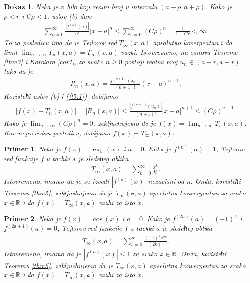 \documentclass[12pt,a4paper]{article}
\newtheorem{pri}{Primer}[section]
\newtheorem*{dokaz}{Dokaz}
\begin{document}
\begin{dokaz}
Neka je $x$ bilo koji realni broj u intervalu 
$(a-\rho,a+\rho)$. 
Kako je $\rho<r$ i $C\rho<1$, uslov (b) daje 
\begin{align*}
    \sum_{n=0}^{\infty}
    \frac{|f^{(n)}(a)|}{n!}|x-a|^{n}
    \leq 
    \sum_{n=0}^{\infty}
    (C\rho)^{n}
    =
    \frac{1}{1-Cr}<\infty. 
\end{align*}
To za posledicu ima da je 
Tejlorov red $T_{\infty}(x,a)$ apsolutno 
kovergentan i da limit 
$\lim_{n\rightarrow\infty}T_{n}(x,a)=T_{\infty}(x,a)$
vazhi. 
Istovremeno, na osnovu Teoreme \ref{thm3} i Korolara \ref{cor1}, 
za svako $n\geq 0$ postoji realna broj 
$u_{n}\in(a-r,a+r)$ tako da je 
\begin{align}\label{t5.1}
    R_{n}(x,a)
    =
    \frac{f^{(n+1)}(u_{n})}{(n+1)!}(x-a)^{n+1}. 
\end{align}
Koristeћi uslov (b) i (\ref{t5.1}), dobijamo 
\begin{align*}
    |f(x)-T_{n}(x,a)|
    =
    |R_{n}(x,a)|
    \leq 
    \frac{|f^{(n+1)}(u_{n})|}{(n+1)!}|x-a|^{n+1}
    \leq 
    (C\rho)^{n+1}. 
\end{align*}
Kako je $\lim_{n\rightarrow\infty}(C\rho)^{n}=0$, 
zakljuchujemo da je $f(x)=\lim_{n\rightarrow\infty}T_{n}(x,a)$. 
Kao neposrednu posledicu, dobijamo $f(x)=T_{\infty}(x,a)$. 
\end{dokaz}

\begin{pri}
Neka je $f(x)=\exp(x)$ i $a=0$. 
Kako je $f^{(n)}(a)=1$,  
Tejlorov red 
funkcije $f$ u tachki $a$ je sledeћeg oblika
\begin{align*}
    T_{\infty}(x,a)
    =
    \sum_{k=0}^{\infty}\frac{x^{k}}{k!}. 
\end{align*}
Istovremeno, imamo da je su izvodi $|f^{(n)}(x)|$ 
nezavisni od $n$. 
Onda, koristeћi Teoremu \ref{thm5}, 
zakljuchujemo da je $T_{\infty}(x,a)$ apsolutno konvergentan
za svako $x\in\mathbb{R}$
i da $f(x)=T_{\infty}(x,a)$ vazhi za isto $x$. 
\end{pri}

\begin{pri}
Neka je $f(x)=\cos(x)$ i $a=0$. 
Kako je $f^{(2n)}(a)=(-1)^{n}$
i $f^{(2n+1)}(a)=0$,  
Tejlorov red 
funkcije $f$ u tachki $a$ je sledeћeg oblika
\begin{align*}
    T_{\infty}(x,a)
     =
    \sum_{k=0}^{\infty}\frac{(-1)^{k}x^{2k}}{(2k)!}. 
\end{align*}
Istovremeno, imamo da je $|f^{(n)}(x)|\leq 1$ 
za svako $x\in\mathbb{R}$. 
Onda, koristeћi Teoremu \ref{thm5}, 
zakljuchujemo da je $T_{\infty}(x,a)$ apsolutno konvergentan
za svako $x\in\mathbb{R}$
i da $f(x)=T_{\infty}(x,a)$ vazhi za isto $x$. 
\end{pri}
\end{document}
